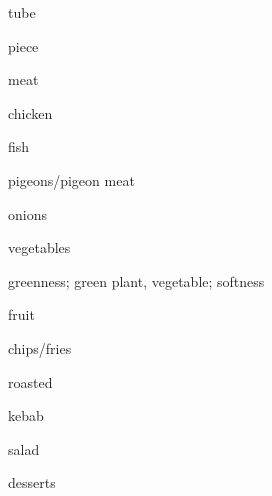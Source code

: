 \begin{flashcard}{\LARGE tube}
\LARGE {}
\end{flashcard}
\begin{flashcard}{\LARGE piece}
\LARGE {}
\end{flashcard}
\begin{flashcard}{\LARGE meat}
\LARGE {}
\end{flashcard}
\begin{flashcard}{\LARGE chicken}
\LARGE {}
\end{flashcard}
\begin{flashcard}{\LARGE fish}
\LARGE {}
\end{flashcard}
\begin{flashcard}{\LARGE pigeons/pigeon meat}
\LARGE {}
\end{flashcard}
\begin{flashcard}{\LARGE onions}
\LARGE {}
\end{flashcard}
\begin{flashcard}{\LARGE vegetables}
\LARGE {}
\end{flashcard}
\begin{flashcard}{\LARGE greenness; green plant, vegetable; softness}
\LARGE {}
\end{flashcard}
\begin{flashcard}{\LARGE fruit}
\LARGE {}
\end{flashcard}
\begin{flashcard}{\LARGE chips/fries}
\LARGE {}
\end{flashcard}
\begin{flashcard}{\LARGE roasted}
\LARGE {}
\end{flashcard}
\begin{flashcard}{\LARGE kebab}
\LARGE {}
\end{flashcard}
\begin{flashcard}{\LARGE salad}
\LARGE {}
\end{flashcard}
\begin{flashcard}{\LARGE desserts}
\LARGE {}
\end{flashcard}
